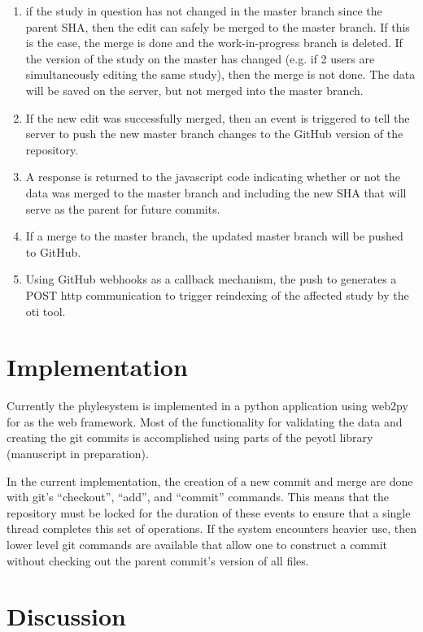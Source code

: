 \documentclass{bioinfo}
\newcommand{\ps}{phylesystem\xspace}
\begin{document}
\begin{methods}
\begin{enumerate}
    \item if the study in question has not changed in the master branch since the parent SHA, then the edit can safely be merged to the master branch.
        If this is the case, the merge is done and the work-in-progress branch is deleted.
        If the version of the study on the master has changed (e.g. if 2 users are simultaneously editing the same study),
        then the merge is not done. The data will be saved on the server, but not merged into the master branch.
    \item If the new edit was successfully merged, then an event is triggered to tell the server to push the new master branch changes to the GitHub version
        of the repository.
    \item A response is returned to the javascript code indicating whether or not the data was 
        merged to the master branch and including the new SHA that will serve as the parent for future commits.
    \item If a merge to the master branch, the updated master branch will be pushed to GitHub.
    \item Using GitHub webhooks as a callback mechanism, the push to generates a POST http communication to trigger reindexing
        of the affected study by the oti tool.
\end{enumerate}

\section{Implementation}
Currently the \ps is implemented in a python application using web2py for as the web framework.
Most of the functionality for validating the data and creating the git commits is accomplished using
    parts of the peyotl library (manuscript in preparation).

In the current implementation, the creation of a new commit and merge are done with git's ``checkout'', ``add'', and ``commit'' commands.
This means that the repository must be locked for the duration of these events 
    to ensure that a single thread completes this set of operations.
If the system encounters heavier use, then lower level git commands 
    are available that allow one to construct a commit without checking out
    the parent commit's version of all files.
\end{methods}

\section{Discussion}
\end{document}
